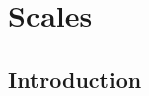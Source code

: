 

\chapter{Scales}

% 
% 
% 
% 
% 
% 
% 
% 
% 
% 
% 


\section{Introduction}\label{sec:introduction}

